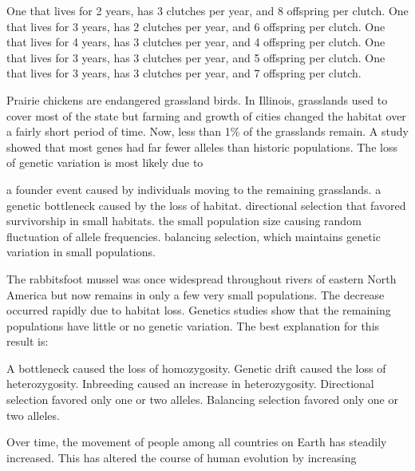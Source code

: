 \begin{choices}
\choice One that lives for 2 years, has 3 clutches per year, and 8 offspring per clutch. 
\choice One that lives for 3 years, has 2 clutches per year, and 6 offspring per clutch. 
\choice One that lives for 4 years, has 3 clutches per year, and 4 offspring per clutch.
\choice One that lives for 3 years, has 3 clutches per year, and 5 offspring per clutch.
\correctchoice One that lives for 3 years, has 3 clutches per year, and 7 offspring per clutch. 
\end{choices}

\question
Prairie chickens are endangered grassland birds. In Illinois, 
grasslands used to cover most of the state but farming and growth of 
cities changed the habitat over a fairly short period of time. Now, 
less than 1\% of the grasslands remain. A study showed that most genes 
had far fewer alleles than historic populations. The loss of genetic 
variation is most likely due to

\begin{choices}
	\choice a founder event caused by individuals moving to the remaining grasslands. 
	\correctchoice a genetic bottleneck caused by the loss of habitat. 
	\choice directional selection that favored survivorship in small habitats. 
	\choice the small population size causing random fluctuation of allele frequencies. 
	\choice balancing selection, which maintains genetic variation in small populations. 
\end{choices}

\question
The rabbitsfoot mussel was once widespread throughout rivers of eastern North America but now remains in only a few very small populations. The decrease occurred rapidly due to habitat loss. Genetics studies show that the remaining populations have little or no genetic variation. The best explanation for this result is:

\begin{choices}
	\choice A bottleneck caused the loss of homozygosity. 
	\correctchoice Genetic drift caused the loss of heterozygosity. 
	\choice Inbreeding caused an increase in heterozygosity. 
	\choice Directional selection favored only one or two alleles. 
	\choice Balancing selection favored only one or two alleles. 
\end{choices}


\question
Over time, the movement of people among all countries on Earth has steadily increased. This has altered the course of human evolution by increasing

